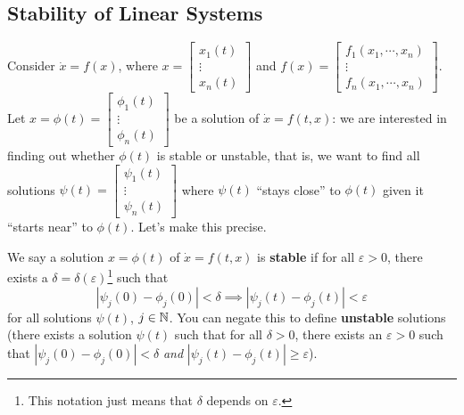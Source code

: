 \subsection{Stability of Linear Systems}
Consider $\dot x=f(x)$, where $x=
\begin{bmatrix}
    x_1(t)\\ \vdots \\x_n (t)
\end{bmatrix}$ and $f(x)=
\begin{bmatrix}
    f_1(x_1,\cdots ,x_n ) \\ \vdots \\ f_n (x_1,\cdots ,x_n )
\end{bmatrix}$. Let $x=\phi(t)=
\begin{bmatrix}
    \phi_1(t)\\ \vdots \\ \phi_n (t)
\end{bmatrix}$ be a solution of $\dot x=f(t,x)$: we are interested in finding out whether $\phi(t)$ is stable or unstable, that is, we want to find all solutions $\psi(t)=
\begin{bmatrix}
    \psi_1(t) \\ \vdots \\ \psi_n (t)
\end{bmatrix}$ where $\psi(t)$ ``stays close'' to $\phi(t)$ given it ``starts near'' to $\phi(t)$. Let's make this precise.
\begin{definition}[Stability]
    We say a solution $x=\phi(t)$ of $\dot x=f(t,x)$ is \textbf{stable} if for all $\varepsilon >0$, there exists a $\delta=\delta(\varepsilon )$\footnote{This notation just means that $\delta$ depends on $\varepsilon $.} such that \[
        |\psi_j (0)-\phi_j (0)|<\delta \implies |\psi_j (t)-\phi_j (t)|<\varepsilon 
    \] for all solutions $\psi(t)$, $j\in \mathbb{N}$. You can negate this to define \textbf{unstable} solutions (there exists a solution $\psi(t)$ such that for all $\delta>0$, there exists an $\varepsilon >0$ such that $|\psi_j (0)-\phi_j (0)|<\delta$ \emph{and} $|\psi_j (t)-\phi_j (t)|\geq \varepsilon $).
\end{definition}
